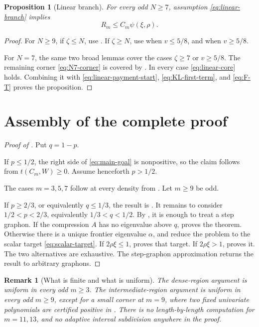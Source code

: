 \documentclass[11pt]{article}
\newtheorem{proposition}[theorem]{Proposition}
\newtheorem{remark}[theorem]{Remark}
\begin{document}
\begin{proposition}[Linear branch]\label{prop:linear-branch}
For every odd \(N\ge7\), assumption \eqref{eq:linear-branch} implies
\[
       R_m\le C_m\psi(\xi,\rho).
\]
\end{proposition}

\begin{proof}
For \(N\ge9\), if \(\zeta\le N\), use
.  If \(\zeta\ge N\), use
 when \(v\le5/8\), and
 when \(v\ge5/8\).

For \(N=7\), the same two broad lemmas cover the cases
\(\zeta\ge7\) or \(v\ge5/8\).  The remaining corner
\eqref{eq:N7-corner} is covered by
.
In every case \eqref{eq:linear-core} holds.  Combining it with
\eqref{eq:linear-payment-start}, \eqref{eq:KL-first-term}, and
\eqref{eq:F-T} proves the proposition.
\end{proof}


\section{Assembly of the complete proof}\label{sec:assembly}

\begin{proof}[Proof of ]
Put \(q=1-p\).

If \(p\le1/2\), the right side of \eqref{eq:main-goal} is nonpositive, so the
claim follows from \(t(C_m,W)\ge0\).  Assume henceforth \(p>1/2\).

The cases \(m=3,5,7\) follow at every density from
.  Let \(m\ge9\) be odd.

If \(p\ge2/3\), or equivalently \(q\le1/3\), the result is
.  It remains to consider
\(1/2<p<2/3\), equivalently \(1/3<q<1/2\).
By , it is enough to treat a step graphon.  If the
compression \(A\) has no eigenvalue above \(q\),
 proves the theorem.  Otherwise there is a unique
frontier eigenvalue \(\alpha\), and
 reduce the problem to the scalar
target \eqref{eq:scalar-target}.  If \(2\rho\xi\le1\),
 proves that target.  If \(2\rho\xi>1\),
 proves it.  The two alternatives are exhaustive.
The step-graphon approximation returns the result to arbitrary graphons.
\end{proof}

\begin{remark}[What is finite and what is uniform]
The dense-region argument is uniform in every odd \(m\ge3\).  The
intermediate-region argument is uniform in every odd \(m\ge9\), except for a
small corner at \(m=9\), where two fixed univariate polynomials are certified
positive in .  There is no length-by-length computation
for \(m=11,13\), and no adaptive interval subdivision anywhere in the proof.
\end{remark}
\end{document}
